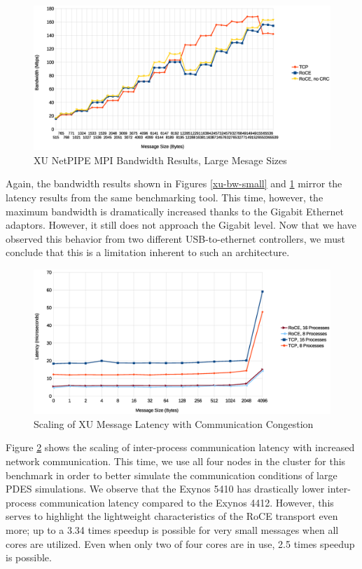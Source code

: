\documentclass[11pt]{book}
\begin{document}
\begin{figure}
\includegraphics[width=\textwidth]{xu_bw_large}
\caption{XU NetPIPE MPI Bandwidth Results, Large Mesage Sizes}
\label{xu-bw-large}
\end{figure}

Again, the bandwidth results shown in Figures \ref{xu-bw-small} and
\ref{xu-bw-large} mirror the latency results from the same benchmarking
tool. This time, however, the maximum bandwidth is dramatically increased thanks
to the Gigabit Ethernet adaptors. However, it still does not approach the
Gigabit level. Now that we have observed this behavior from two different
USB-to-ethernet controllers, we must conclude that this is a limitation inherent
to such an architecture.

\begin{figure}
\includegraphics[width=\textwidth]{xu_imb}
\caption{Scaling of XU Message Latency with Communication Congestion}
\label{xu-imb-low}
\end{figure}

Figure \ref{xu-imb-low} shows the scaling of inter-process
communication latency with increased network communication. This time, we use
all four nodes in the cluster for this benchmark in order to better simulate the
communication conditions of large PDES simulations. We observe that the Exynos
5410 has drastically lower inter-process communication latency compared to the
Exynos 4412. However, this serves to highlight the lightweight characteristics
of the RoCE transport even more; up to a 3.34 times speedup is possible for very
small messages when all cores are utilized. Even when only two of four cores are
in use, 2.5 times speedup is possible.
\end{document}
